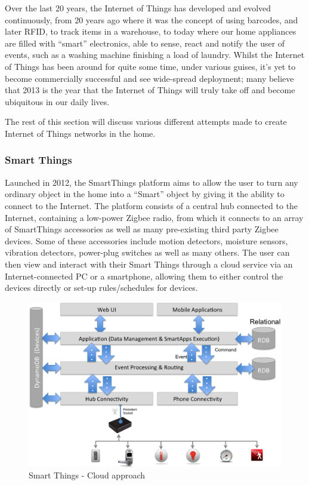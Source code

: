 Over the last 20 years, the Internet of Things has developed and evolved continuously, from 20 years ago where it was the concept of using barcodes, and later RFID\cite{K.Ashton}, to track items in a warehouse, to today where our home appliances are filled with ``smart'' electronics, able to sense, react and notify the user of events, such as a washing machine finishing a load of laundry. Whilst the Internet of Things has been around for quite some time, under various guises, it's yet to become commercially successful and see wide-spread deployment; many believe that 2013 is the year that the Internet of Things will truly take off and become ubiquitous in our daily lives\cite{2013IoT}.

The rest of this section will discuss various different attempts made to create Internet of Things networks in the home.

\subsubsection{Smart Things} %
\label{ssub:smart_things}
Launched in 2012, the SmartThings platform aims to allow the user to turn any ordinary object in the home into a ``Smart'' object by giving it the ability to connect to the Internet. The platform consists of a central hub connected to the Internet, containing a low-power Zigbee radio, from which it connects to an array of SmartThings accessories as well as many pre-existing third party Zigbee devices. Some of these accessories include motion detectors, moisture sensors, vibration detectors, power-plug switches as well as many others. The user can then view and interact with their Smart Things through a cloud service via an Internet-connected PC or a smartphone, allowing them to either control the devices directly or set-up rules/schedules for devices.

\begin{figure}[h!]
\centering
    \includegraphics[scale=0.4]{images/smartThingsCloudFirstDiagram.png}
    \caption[]{Smart Things - Cloud approach\footnotemark}
    \label{fig:cloud}
\end{figure}

